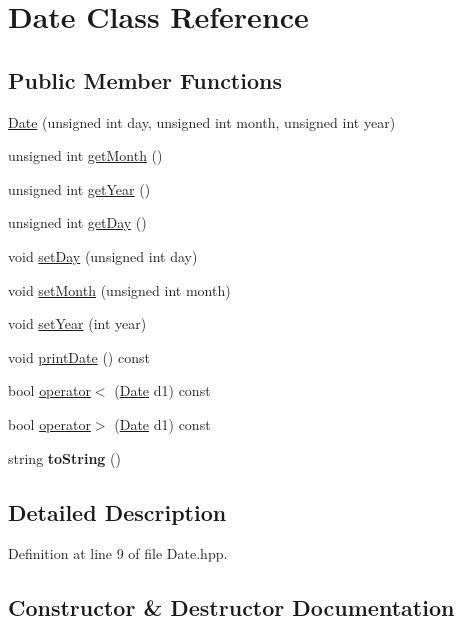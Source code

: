 \hypertarget{classDate}{}\section{Date Class Reference}
\label{classDate}
\subsection*{Public Member Functions}
\begin{DoxyCompactItemize}
\item 
\hyperlink{classDate_a28c6604a0f8ed8216becf24abc20cf5b}{Date} (unsigned int day, unsigned int month, unsigned int year)
\item 
unsigned int \hyperlink{classDate_a9efc6db1870de82dbd717f1c3c782f82}{get\+Month} ()
\item 
unsigned int \hyperlink{classDate_a90be6a509b91ee9addfeec0e68b965e2}{get\+Year} ()
\item 
unsigned int \hyperlink{classDate_ab39b571a45cbcdfd37b23c28801fa7b0}{get\+Day} ()
\item 
void \hyperlink{classDate_a18dc2bd52ab8adcca331f66c27ed6623}{set\+Day} (unsigned int day)
\item 
void \hyperlink{classDate_aa83b79359070012ab58ff99abeb34340}{set\+Month} (unsigned int month)
\item 
void \hyperlink{classDate_a895c4ae9868e43577cf59d9c679d7a71}{set\+Year} (int year)
\item 
void \hyperlink{classDate_a6d5873842b1ede5d95399220d7994c7b}{print\+Date} () const
\item 
bool \hyperlink{classDate_a2fdc0ec866aa7e1b3f8e1a7468663827}{operator$<$} (\hyperlink{classDate}{Date} d1) const
\item 
bool \hyperlink{classDate_aa71c76d80b90438a9b507e8fba4beaa4}{operator$>$} (\hyperlink{classDate}{Date} d1) const
\item 
\mbox{\label{classDate_afc8db375619a48b87cd267e801cc2230}} 
string {\bfseries to\+String} ()
\end{DoxyCompactItemize}


\subsection{Detailed Description}


Definition at line 9 of file Date.\+hpp.



\subsection{Constructor \& Destructor Documentation}
\mbox{\label{classDate_a28c6604a0f8ed8216becf24abc20cf5b}} 
